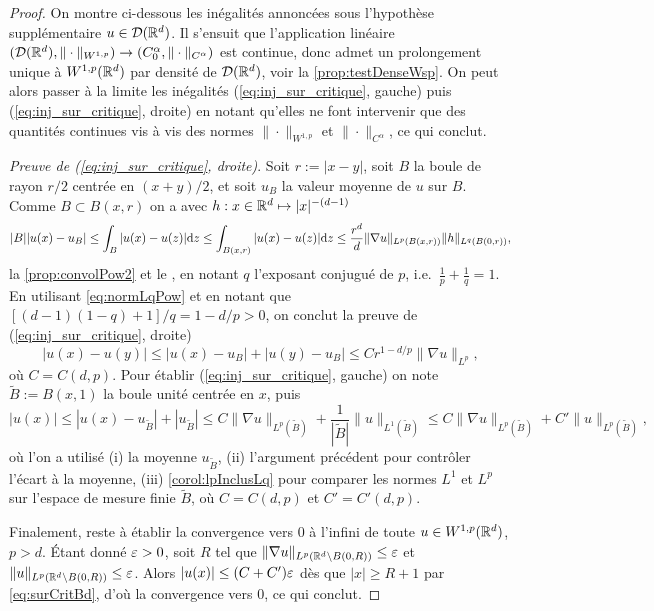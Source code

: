 \begin{proof}
On montre ci-dessous les inégalités annoncées sous l'hypothèse supplémentaire $u \in \mathcal{D}(\mathbb{R}^d)$. 
Il s'ensuit que l'application linéaire $(\mathcal{D}(\mathbb{R}^d), \|\cdot\|_{W^{1,p}}) \to (C^\alpha_0, \|\cdot\|_{C^\alpha})$ est continue, donc admet un prolongement unique à $W^{1,p}(\mathbb{R}^d)$ par densité de $\mathcal{D}(\mathbb{R}^d)$, voir la \cref{prop:testDenseWsp}.
On peut alors passer à la limite les inégalités (\ref{eq:inj_sur_critique}, gauche) puis (\ref{eq:inj_sur_critique}, droite) en notant qu'elles ne font intervenir que des quantités continues vis à vis des normes $\|\cdot\|_{W^{1,p}}$ et $\|\cdot\|_{C^\alpha}$, ce qui conclut.

\emph{Preuve de (\ref{eq:inj_sur_critique}, droite)}. Soit $r := |x-y|$, soit $B$ la boule de rayon $r/2$ centrée en $(x+y)/2$, et soit $u_B$ la valeur moyenne de $u$ sur $B$. Comme $B \subset B(x,r)$ on a avec $h : x \in \mathbb{R}^d \mapsto |x|^{-(d-1)}$
\begin{equation*}
	|B| |u(x)-u_B| \leq \int_{B} |u(x)-u(z)| \mathrm{d} z \leq  \int_{B(x,r)} |u(x)-u(z)| \mathrm{d} z \leq \frac{r^d}{d} \|\nabla u\|_{L^p(B(x,r))} \| h\|_{L^q(B(0,r))},
\end{equation*} 
la \cref{prop:convolPow2} et le , en notant $q$ l'exposant conjugué de $p$, i.e.\ $\frac 1 p + \frac 1 q =1$. 
En utilisant \eqref{eq:normLqPow} et en notant que $[(d-1)(1-q)+1]/q = 1-d/p>0$, on conclut la preuve de (\ref{eq:inj_sur_critique}, droite) 
\begin{equation*}
	|u(x)-u(y)| \leq |u(x)-u_B|+|u(y)-u_B| \leq C r^{1-d/p} \| \nabla u\|_{L^p}, 
\end{equation*}
où $C = C(d,p)$. 
Pour établir (\ref{eq:inj_sur_critique}, gauche) on note $\tilde B := B(x,1)$ la boule unité centrée en $x$, puis
\begin{equation}
\label{eq:surCritBd}
	|u(x)| 
	\leq |u(x)-u_{\tilde B}| + |u_{\tilde B}| 
	\leq C \|\nabla u\|_{L^p(\tilde B)} + \frac 1 {|\tilde B|} \|u\|_{L^1(\tilde B)} 
	\leq C \|\nabla u\|_{L^p(\tilde B)} + C'\|u\|_{L^p(\tilde B)},
\end{equation}
où l'on a utilisé (i) la moyenne $u_{\tilde B}$, (ii) l'argument précédent pour contrôler l'écart à la moyenne, (iii) \cref{corol:lpInclusLq} pour comparer les normes $L^1$ et $L^p$ sur l'espace de mesure finie $\tilde B$, où $C = C(d,p)$ et $C'=C'(d,p)$. 

Finalement, reste à établir la convergence vers $0$ à l'infini de toute $u \in W^{1,p}(\mathbb{R}^d)$, $p>d$. 
Étant donné $\varepsilon>0$, soit $R$ tel que $\|\nabla u\|_{L^p(\mathbb{R}^d \setminus B(0,R))} \leq \varepsilon $ et $\| u\|_{L^p(\mathbb{R}^d \setminus B(0,R))} \leq \varepsilon$. Alors $|u(x)| \leq (C+C') \varepsilon$ dès que $|x| \geq R+1$ par \eqref{eq:surCritBd}, d'où la convergence vers $0$, ce qui conclut. 
\end{proof}

